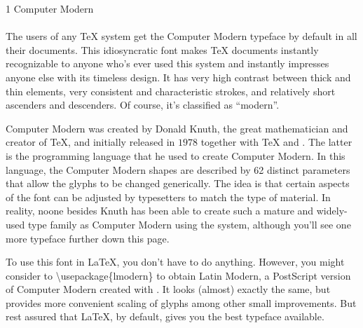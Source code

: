 \documentclass{article}
\begin{document}
\frenchspacing

\noindent
{\LARGE 1 Computer Modern}\\
~\\
\noindent
The users of any \TeX{} system get the Computer Modern typeface by default in
all their documents.  This idiosyncratic font makes \TeX{} documents
instantly recognizable to anyone who's ever used this system and instantly
impresses anyone else with its timeless design.  It has very high contrast
between thick and thin elements, very consistent and characteristic
strokes, and relatively short ascenders and descenders.  Of course, it's
classified as ``modern''.

Computer Modern was created by Donald Knuth, the great mathematician and
creator of \TeX, and initially released in $1978$ together with \TeX{} and
\MF.  The latter is the programming language that he used to create Computer
Modern.  In this language, the Computer Modern shapes are described by 62
distinct parameters that allow the glyphs to be changed generically.  The
idea is that certain aspects of the font can be adjusted by typesetters to
match the type of material.  In reality, noone besides Knuth has been able
to create such a mature and widely-used type family as Computer Modern using
the \MF{} system, although you'll see one more \MF{} typeface further down
this page.

To use this font in \LaTeX, you don't have to do anything. However, you might consider
to \textbackslash usepackage\{lmodern\} to obtain Latin Modern,
a PostScript version of Computer Modern created with \MP.  It looks
(almost) exactly the same, but provides more convenient scaling of glyphs
among other small improvements.  But rest assured that \LaTeX{}, by default,
gives you the best typeface available.
\end{document}
